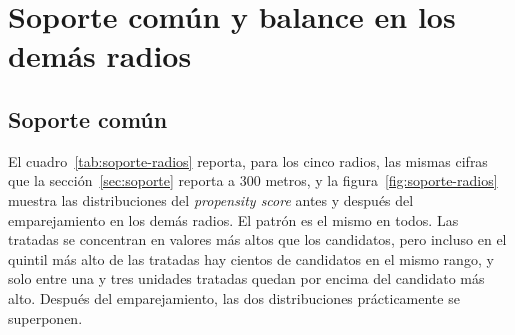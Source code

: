 \chapter{Soporte común y balance en los demás radios}
\label{apendice:balance}

\section{Soporte común}

\noindent El cuadro~\ref{tab:soporte-radios} reporta, para los cinco radios, las mismas cifras que la sección~\ref{sec:soporte} reporta a 300 metros, y la figura~\ref{fig:soporte-radios} muestra las distribuciones del \emph{propensity score} antes y después del emparejamiento en los demás radios. El patrón es el mismo en todos. Las tratadas se concentran en valores más altos que los candidatos, pero incluso en el quintil más alto de las tratadas hay cientos de candidatos en el mismo rango, y solo entre una y tres unidades tratadas quedan por encima del candidato más alto. Después del emparejamiento, las dos distribuciones prácticamente se superponen.

